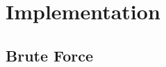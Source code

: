 \section{Implementation}
\label{sec:imp}
\subsection{Brute Force}
\label{sec:brute}
















